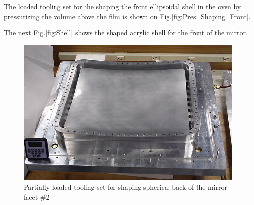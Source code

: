 The loaded tooling set for the shaping the front ellipsoidal shell in the oven by pressurizing the volume above the film is shown on  Fig.\ref{fig:Pres_Shaping_Front}.

The next Fig.\ref{fig:Shell} shows the shaped acrylic shell for the front of the mirror.

\begin{figure}[h]
    \centering
    \includegraphics[width=0.95\linewidth]{Vac_Mol_Back.png}
    \caption{Partially loaded tooling set for shaping spherical back of the mirror facet \#2}
    \label{fig:Vac_Mol_Back}
\end{figure}{}

